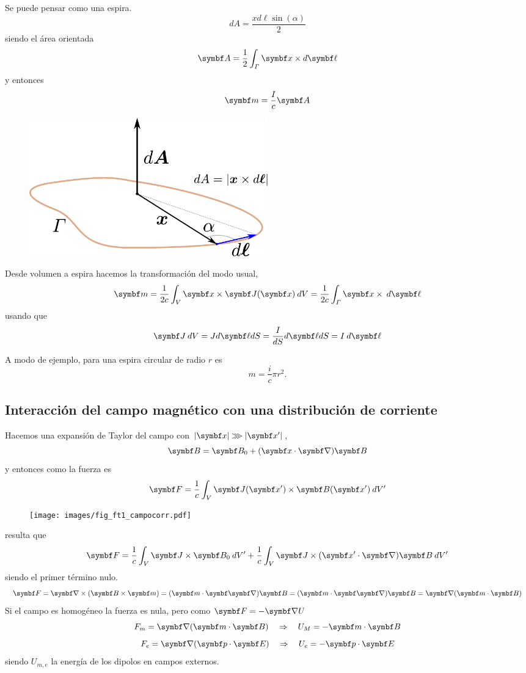 \documentclass[10pt,oneside]{CBFT_book}
\begin{document}
Se puede pensar  como una espira.
\[
	dA = \frac{ x d\ell \sin(\alpha) }{2}
\]
siendo el área orientada
\[
	\vb{A} = \frac{1}{2} \int_\Gamma \vb{x}\times d\vb{\ell} 
\]
y entonces
\[
	\vb{m} = \frac{I}{c}\vb{A}
\]
\begin{figure}[htb]
	\begin{center}
	\includegraphics[width=0.5\textwidth]{images/fig_ft1_mmag.pdf}	 
	\end{center}
	\caption{}
\end{figure}

Desde volumen a espira hacemos la transformación del modo usual,
\[
	\vb{m} = \frac{1}{2c} \int_V  \vb{x} \times \vb{J}(\vb{x})  \:dV =
		\frac{1}{2c} \int_\Gamma  \vb{x} \times \:d\vb{\ell}
\]
usando que
\[
	\vb{J} \: dV = J d\vb{\ell} dS = \frac{I}{dS} d\vb{\ell} dS = I \: d\vb{\ell} 
\]

A modo de ejemplo, para una espira circular de radio $r$ es
\[
	m = \frac{i}{c} \pi r^2.
\]

\subsection{Interacción del campo magnético con una distribución de corriente}

Hacemos una expansión de Taylor del campo  con $|\vb{x}|\ggg|\vb{x}'|$,
\[
	\vb{B} = \vb{B}_0 + (\vb{x}\cdot\Nabla)\vb{B}
\]
y entonces como la fuerza es
\[
	\vb{F} = \frac{1}{c} \int_V \vb{J}(\vb{x}') \times \vb{B}(\vb{x}') \: dV'
\]
\begin{figure}[htb]
	\begin{center}
	\texttt{[image: images/fig\_ft1\_campocorr.pdf]}	 
	\end{center}
	\caption{}
\end{figure}
resulta que
\[
	\vb{F} =  \frac{1}{c} \int_V \vb{J} \times \vb{B}_0 \: dV' +
		\frac{1}{c} \int_V \vb{J} \times (\vb{x}'\cdot\Nabla)\vb{B} \: dV'
\]
siendo el primer término nulo.
\[
	\vb{F} = \Nabla\times(\pv{B}{m}) = (\pe{m}{\Nabla})\vb{B} =
		(\pe{m}{\Nabla})\vb{B} = \Nabla(\pe{m}{B})
\]
Si el campo es homogéneo la fuerza es nula, pero como $\vb{F} = -\Nabla U$
\[
	F_m = \Nabla(\pe{m}{B}) \quad \Rightarrow \quad U_M = -\pe{m}{B}
\]
\[
	F_e = \Nabla(\pe{p}{E}) \quad \Rightarrow \quad U_e = -\pe{p}{E}
\]
siendo $U_{m,e}$ la energía de los dipolos en campos externos.
\end{document}
